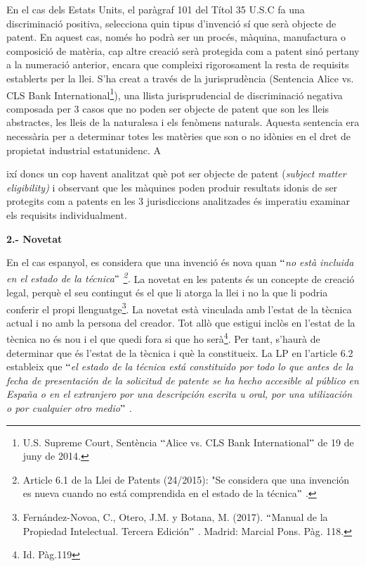 \documentclass[12pt]{article}
\begin{document}
\begin{justify}
{\fontsize{11pt}{13.2pt}\selectfont En el cas dels Estats Units, el paràgraf 101 del Títol 35 U.S.C fa una discriminació positiva, selecciona quin tipus d’invenció sí que serà objecte de patent. En aquest cas, només ho podrà ser un procés, màquina, manufactura o composició de matèria, cap altre creació serà protegida com a patent sinó pertany a la numeració anterior, encara que compleixi rigorosament la resta de requisits establerts per la llei. S’ha creat a través de la jurisprudència (Sentencia Alice vs. CLS Bank International\footnote{ U.S. Supreme Court, Sentència $``$Alice vs. CLS Bank International$"$  de 19 de juny de 2014.  }), una llista jurisprudencial de discriminació negativa composada per 3 casos que no poden ser objecte de patent que son les lleis abstractes, les lleis de la naturalesa i els fenòmens naturals. Aquesta sentencia era necessària per a determinar totes les matèries que son o no idònies en el dret de propietat industrial estatunidenc. A\par}ixí doncs un cop havent analitzat què pot ser objecte de patent (\textit{subject matter eligibility)} i observant que les màquines poden produir resultats idonis de ser protegits com a patents en les 3 jurisdiccions analitzades és imperatiu examinar els requisits individualment. 
\end{justify}\par


\vspace{\baselineskip}
\textbf{2.- Novetat}\par


\vspace{\baselineskip}
\begin{justify}
En el cas espanyol, es considera que una invenció és nova quan \textit{$``$no està incluida en el estado de la técnica$"$ \footnote{ Article 6.1 de la Llei de Patents (24/2015): "Se considera que una invención es nueva cuando no está comprendida en el estado de la técnica$"$ .  }. }La novetat en les patents és un concepte de creació legal, perquè el seu contingut és el que li atorga la llei i no la que li podria conferir el propi llenguatge\footnote{ Fernández-Novoa, C., Otero, J.M. y Botana, M. (2017). $``$Manual de la Propiedad Intelectual. Tercera Edición$"$ . Madrid: Marcial Pons. Pàg. 118.  }. La novetat està vinculada amb l’estat de la tècnica actual i no amb la persona del creador. Tot allò que estigui inclòs en l’estat de la tècnica no és nou i el que quedi fora si que ho serà\footnote{ Id. Pàg.119 }. Per tant, s’haurà de determinar que és l’estat de la tècnica i què la constitueix.  La LP en l’article 6.2 estableix que $``$\textit{el estado de la técnica está constituido por todo lo que antes de la fecha de presentación de la solicitud de patente se ha hecho accesible al público en España o en el extranjero por una descripción escrita u oral, por una utilización o por cualquier otro medio$"$ . }
\end{justify}\par
\end{document}

